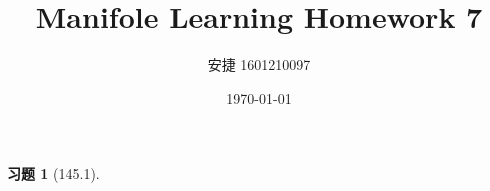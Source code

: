 \documentclass[a4paper, UTF8]{ctexart}
\title{Manifole Learning Homework 7}
\date{\today}
\author{安捷 1601210097}
\newtheorem*{exercise}{\textbf{习题}}
\begin{document}
\maketitle
	\begin{exercise}[145.1]
		
	\end{exercise}
\end{document}
